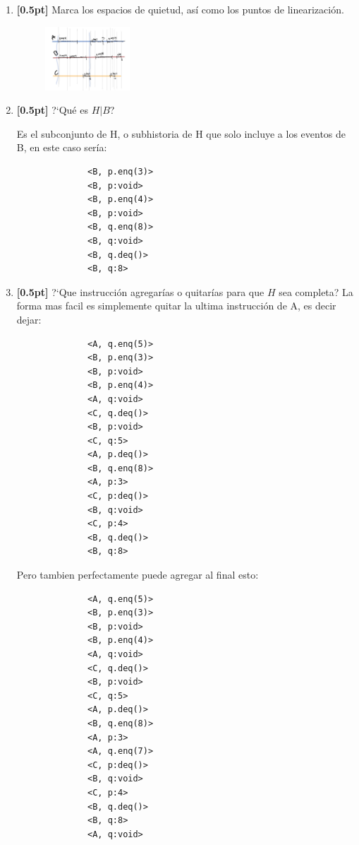 \documentclass[a4paper,11pt]{article}
\begin{document}
\begin{enumerate}
{\begin{enumerate}
{          \clearpage
        
        }
        \item{
          \textbf{[0.5pt]} Marca los espacios de quietud, 
          así como los puntos de linearización.

          \begin{figure}[!h]
            \centering
            \includegraphics[width=0.3\textwidth]{Graphics/1a}
          \end{figure}

          }
        \item{
            \textbf{[0.5pt]} ?`Qué es $H|B$?

            Es el subconjunto de H, o subhistoria de H que solo incluye a los eventos de B, en este caso sería:
            \begin{verbatim}
              <B, p.enq(3)>
              <B, p:void>
              <B, p.enq(4)>
              <B, p:void>
              <B, q.enq(8)>
              <B, q:void>
              <B, q.deq()>
              <B, q:8>
            \end{verbatim}
            
            }
        \item{\textbf{[0.5pt]} ?`Que instrucción agregarías o quitarías para que $H$ sea completa?
            La forma mas facil es simplemente quitar la ultima instrucción de A, es decir dejar:

            \begin{verbatim}
              <A, q.enq(5)>
              <B, p.enq(3)>
              <B, p:void>
              <B, p.enq(4)>
              <A, q:void>
              <C, q.deq()>
              <B, p:void>
              <C, q:5>
              <A, p.deq()>
              <B, q.enq(8)>
              <A, p:3>
              <C, p:deq()>
              <B, q:void>
              <C, p:4>
              <B, q.deq()>
              <B, q:8>
            \end{verbatim}

            Pero tambien perfectamente puede agregar al final esto:
            \begin{verbatim}
              <A, q.enq(5)>
              <B, p.enq(3)>
              <B, p:void>
              <B, p.enq(4)>
              <A, q:void>
              <C, q.deq()>
              <B, p:void>
              <C, q:5>
              <A, p.deq()>
              <B, q.enq(8)>
              <A, p:3>
              <A, q.enq(7)>
              <C, p:deq()>
              <B, q:void>
              <C, p:4>
              <B, q.deq()>
              <B, q:8>
              <A, q:void>
              \end{verbatim}
        }
        


\end{enumerate}}
\end{enumerate}
\end{document}
